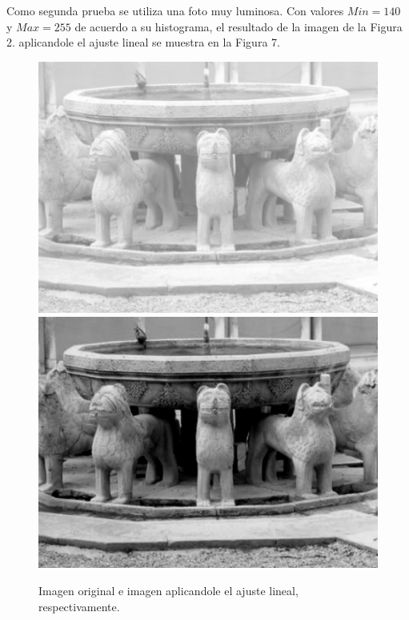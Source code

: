 \documentclass[conference]{IEEEtran}
\begin{document}
Como segunda prueba se utiliza una foto muy luminosa. Con valores $Min=140$ y $Max=255$ de acuerdo a su histograma, el resultado de la imagen de la Figura 2. aplicandole el ajuste lineal se muestra en la Figura 7.

\begin{figure}[h]
	\begin{center}
		\setlength{\unitlength}{0.00105in}
		\includegraphics[scale=0.335]{./images/fuente.png}
		\includegraphics[scale=0.334]{./images/fuente_out.png}
	\end{center}
	\caption{Imagen original e imagen aplicandole el ajuste lineal, respectivamente.}
\end{figure}
\end{document}
